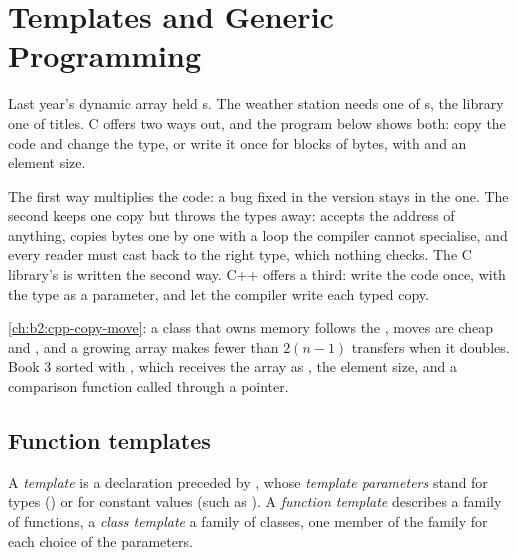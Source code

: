 \chapter{Templates and Generic Programming}\label{ch:b2:cpp-templates}

Last year's dynamic array held s. The weather station needs one of s, the library one of
titles. C offers two ways out, and the program below shows both: copy the code and change the type, or write it once
for blocks of bytes, with  and an element size.

\label{lst:b2:cpp-templates:int-vec}

\label{out:b2:cpp-templates:int-vec}

The first way multiplies the code: a bug fixed in the  version stays in the  one. The second
keeps one copy but throws the types away:  accepts the address of anything, copies bytes one by
one with a loop the compiler cannot specialise, and every reader must cast  back to the right type, which
nothing checks. The C library's  is written the second way. C++ offers a third: write the code once, with
the type as a parameter, and let the compiler write each typed copy.

\begin{recall}
\cref{ch:b2:cpp-copy-move}: a class that owns memory follows the , moves are cheap and ,
and a growing array makes fewer than $2(n-1)$ transfers when it doubles. Book 3 sorted with , which
receives the array as , the element size, and a comparison function called through a pointer.
\end{recall}

\section{Function templates}\label{sec:b2:cpp-templates:functions}

\begin{definition}\label{def:b2:cpp-templates:template}
A \emph{template} is a declaration preceded by , whose
\emph{template parameters} stand for types () or for constant values (such
as ). A \emph{function template} describes a family of functions, a
\emph{class template} a family of classes, one member of the family for each choice of the
parameters.
\end{definition}

